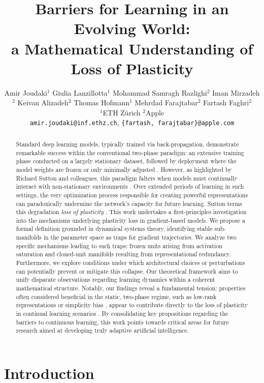 \documentclass{article}
\title{Barriers for Learning in an Evolving World: \\a Mathematical Understanding of Loss of Plasticity}
\author{%
  Amir Joudaki$^{1}$ \And
  Giulia Lanzillotta$^{1}$ \And
  Mohammad Samragh Razlighi$^{2}$ \And
  Iman Mirzadeh$^{2}$ \And
  Keivan Alizadeh$^{2}$ \And
  Thomas Hofmann$^{1}$ \And
  Mehrdad Farajtabar$^{2}$ \And
  Fartash Faghri$^{2}$ %
  \\
  $^{1}$ETH Zürich
  $^{2}$Apple \\
  \texttt{amir.joudaki@inf.ethz.ch},
  \texttt{\{fartash, farajtabar\}@apple.com}
}
\begin{document}
\maketitle

\begin{abstract}
Standard deep learning models, typically trained via back-propagation, demonstrate remarkable success within the conventional two-phase paradigm: an extensive training phase conducted on a largely stationary dataset, followed by deployment where the model weights are frozen or only minimally adjusted \cite{dohare2024loss}. However, as highlighted by Richard Sutton and colleagues, this paradigm falters when models must continually interact with non-stationary environments \cite{dohare2024loss}. Over extended periods of learning in such settings, the very optimization process responsible for creating powerful representations can paradoxically undermine the network's capacity for future learning. Sutton terms this degradation \emph{loss of plasticity} \cite{dohare2024loss} . This work undertakes a first-principles investigation into the mechanisms underlying plasticity loss in gradient-based models. We propose a formal definition grounded in dynamical systems theory, identifying stable sub-manifolds in the parameter space as traps for gradient trajectories. We analyze two specific mechanisms leading to such traps: frozen units arising from activation saturation and cloned-unit manifolds resulting from representational redundancy. Furthermore, we explore conditions under which architectural choices or perturbations can potentially prevent or mitigate this collapse. Our theoretical framework aims to unify disparate observations regarding learning dynamics within a coherent mathematical structure. Notably, our findings reveal a fundamental tension: properties often considered beneficial in the static, two-phase regime, such as low-rank representations or simplicity bias \cite{huh2022lowrank, papyan2020prevalence}, appear to contribute directly to the loss of plasticity in continual learning scenarios \cite{dohare2024loss}. By consolidating key propositions regarding the barriers to continuous learning, this work points towards critical areas for future research aimed at developing truly adaptive artificial intelligence.
\end{abstract}

\section{Introduction}
\end{document}
